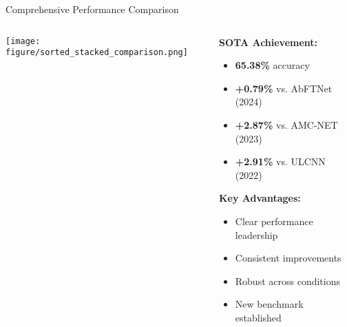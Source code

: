 \documentclass[aspectratio=169]{beamer}
\begin{document}
\begin{frame}{Comprehensive Performance Comparison}
\begin{columns}
\begin{column}{0.6\textwidth}
\texttt{[image: figure/sorted\_stacked\_comparison.png]}
\end{column}
\begin{column}{0.4\textwidth}
\textbf{SOTA Achievement:}
\begin{itemize}
\item \textcolor{zjutred}{\textbf{65.38\%}} accuracy
\item \textcolor{zjutgreen}{\textbf{+0.79\%}} vs. AbFTNet (2024)
\item \textcolor{zjutgreen}{\textbf{+2.87\%}} vs. AMC-NET (2023)
\item \textcolor{zjutgreen}{\textbf{+2.91\%}} vs. ULCNN (2022)
\end{itemize}

\vspace{0.1cm}
\textbf{Key Advantages:}
\begin{itemize}
\item Clear performance leadership
\item Consistent improvements
\item Robust across conditions
\item New benchmark established
\end{itemize}

\vspace{0.1cm}
\begin{center}
\end{center}
\end{column}
\end{columns}
\end{frame}
\end{document}
